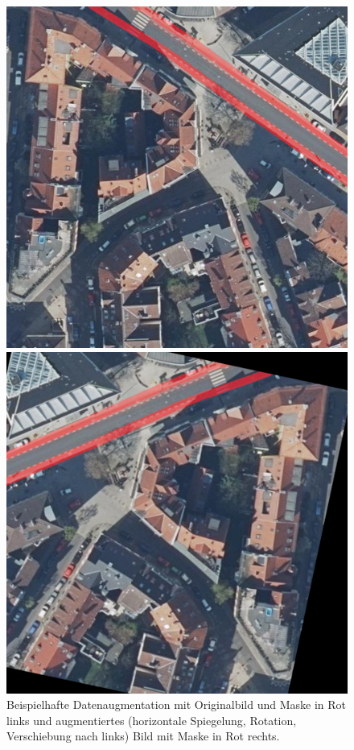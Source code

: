 \begin{figure}
	\centering
	\begin{minipage}{.45\textwidth}
		\centering
		\includegraphics[width=.7\linewidth]{Bilder/cut-example.jpg} 
	\end{minipage}
	\begin{minipage}{.45\textwidth}
		\centering
		\includegraphics[width=.7\linewidth]{Bilder/augmentation-example.png} 
	\end{minipage}

	\caption{Beispielhafte Datenaugmentation mit Originalbild und Maske in Rot links 
	und augmentiertes (horizontale Spiegelung, Rotation, Verschiebung nach links) Bild 
	mit Maske in Rot rechts.  }
	\label{fig:augmentation}
\end{figure} 


